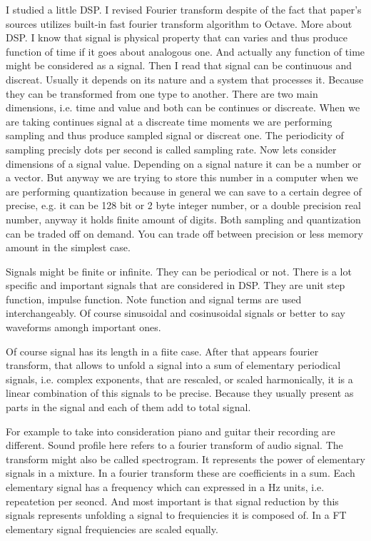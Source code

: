 \documentclass[oneside, final, 14pt]{extarticle}
\begin{document}
	I studied a little DSP. I revised Fourier transform despite of the fact
that paper's sources utilizes built-in fast fourier transform algorithm to
Octave. More about DSP. I know that signal is physical property that can varies
and thus produce function of time if it goes about analogous one. And actually
any function of time might be considered as a signal. Then I read that signal
can be continuous and discreat. Usually it depends on its nature and a system
that processes it. Because they can be transformed from one type to another.
There are two main dimensions, i.e. time and value and both can be continues or
discreate. When we are taking continues signal at a discreate time moments we
are performing sampling and thus produce sampled signal or discreat one. The
periodicity of sampling precisly dots per second is called sampling rate. Now
lets consider dimensions of a signal value. Depending on a signal nature it can
be a number or a vector. But anyway we are trying to store this number in a
computer when we are performing quantization because in general we can save to
a certain degree of precise, e.g. it can be 128 bit or 2 byte integer number,
or a double precision real number, anyway it holds finite amount of digits.
Both sampling and quantization can be traded off on demand. You can trade off
between precision or less memory amount in the simplest case.

Signals might be finite or infinite. They can be periodical or not. There is a
lot specific and important signals that are considered in DSP. They are unit
step function, impulse function. Note function and signal terms are used
interchangeably. Of course sinusoidal and cosinusoidal signals or better to say
waveforms amongh important ones.

Of course signal has its length in a fiite case. After that appears fourier
transform, that allows to unfold a signal into a sum of elementary periodical
signals, i.e. complex exponents, that are rescaled, or scaled harmonically, it
is a linear combination of this signals to be precise. Because they usually
present as parts in the signal and each of them add to total signal.

For example to take into consideration piano and guitar their recording are
different. Sound profile here refers to a fourier transform of audio signal.
The transform might also be called spectrogram. It represents the power of
elementary signals in a mixture. In a fourier transform these are coefficients
in a sum. Each elementary signal has a frequency which can expressed in a Hz
units, i.e. repeatetion per seoncd. And most important is that signal reduction
by this signals represents unfolding a signal to frequiencies it is composed
of. In a FT elementary signal frequiencies are scaled equally.
\end{document}
